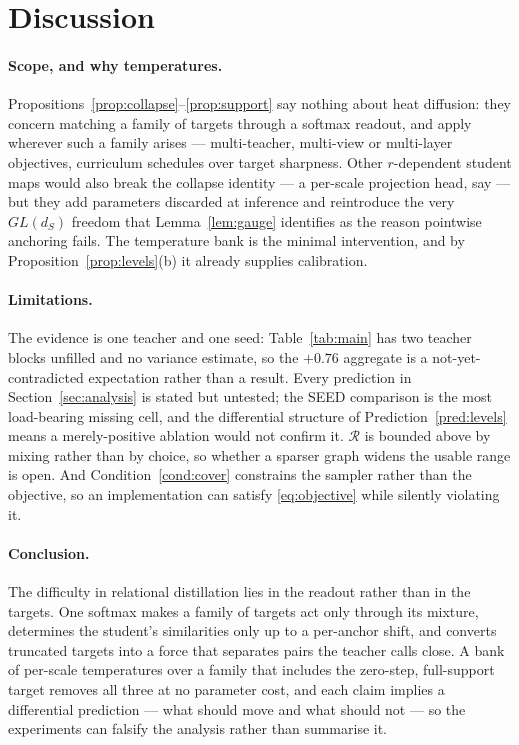 \section{Discussion}
\label{sec:discussion}

\paragraph{Scope, and why temperatures.}
Propositions~\ref{prop:collapse}--\ref{prop:support} say nothing about heat diffusion: they
concern matching a family of targets through a softmax readout, and apply wherever such a
family arises --- multi-teacher, multi-view or multi-layer objectives, curriculum schedules
over target sharpness. Other $r$-dependent student maps would also break the collapse
identity --- a per-scale projection head, say --- but they add parameters discarded at
inference and reintroduce the very $GL(d_S)$ freedom that Lemma~\ref{lem:gauge} identifies as
the reason pointwise anchoring fails. The temperature bank is the minimal intervention, and
by Proposition~\ref{prop:levels}(b) it already supplies calibration.

\paragraph{Limitations.}
The evidence is one teacher and one seed: Table~\ref{tab:main} has two teacher blocks
unfilled and no variance estimate, so the $+0.76$ aggregate is a not-yet-contradicted
expectation rather than a result. Every prediction in Section~\ref{sec:analysis} is stated
but untested; the SEED comparison is the most load-bearing missing cell, and the differential
structure of Prediction~\ref{pred:levels} means a merely-positive ablation would not confirm
it. $\mathcal{R}$ is bounded above by mixing rather than by choice, so whether a sparser
graph widens the usable range is open. And Condition~\ref{cond:cover} constrains the sampler
rather than the objective, so an implementation can satisfy \eqref{eq:objective} while
silently violating it.

\paragraph{Conclusion.}
The difficulty in relational distillation lies in the readout rather than in
the targets. One softmax makes a family of targets act only through its mixture, determines
the student's similarities only up to a per-anchor shift, and converts truncated targets into
a force that separates pairs the teacher calls close. A bank of per-scale temperatures over a
family that includes the zero-step, full-support target removes all three at no parameter
cost, and each claim implies a differential prediction --- what should move and what should
not --- so the experiments can falsify the analysis rather than summarise it.

